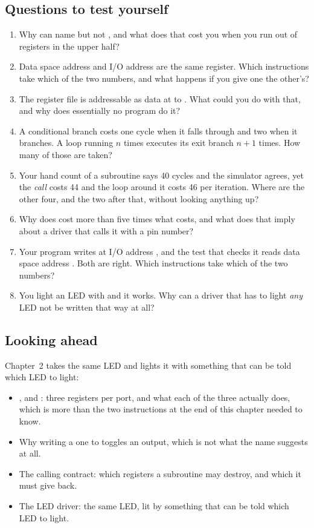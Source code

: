\subsection*{Questions to test yourself}
\begin{enumerate}
  \item Why can  name  but not , and what does that cost you when you
    run out of registers in the upper half?
  \item Data space address  and I/O address  are the same register. Which
    instructions take which of the two numbers, and what happens if you give one the other's?
  \item The register file is addressable as data at  to . What could you
    do with that, and why does essentially no program do it?
  \item A conditional branch costs one cycle when it falls through and two when it branches. A
    loop running $n$ times executes its exit branch $n + 1$ times. How many of those are taken?
  \item Your hand count of a subroutine says 40 cycles and the simulator agrees, yet the
    \emph{call} costs 44 and the loop around it costs 46 per iteration. Where are the other four,
    and the two after that, without looking anything up?
  \item Why does  cost more than five times what  costs,
    and what does that imply about a driver that calls it with a pin number?
  \item Your program writes  at I/O address , and the test that checks it
    reads data space address . Both are right. Which instructions take which of the two
    numbers?
  \item You light an LED with  and it works. Why can a driver that has to light
    \emph{any} LED not be written that way at all?
\end{enumerate}

\subsection*{Looking ahead}
Chapter~2 takes the same LED and lights it with something that can be told which LED to light:
\begin{itemize}
  \item {},  and : three registers per port, and what each of the
    three actually does, which is more than the two  instructions at the end of this
    chapter needed to know.
  \item Why writing a one to  toggles an output, which is not what the name suggests at
    all.
  \item The calling contract: which registers a subroutine may destroy, and which it must give
    back.
  \item The LED driver: the same LED, lit by something that can be told which LED to light.
\end{itemize}


